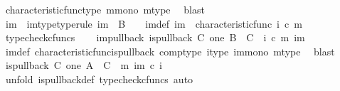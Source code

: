 \begin{isabellebody}
\ characteristic{\isacharunderscore}{\kern0pt}func{\isacharunderscore}{\kern0pt}type\ m{\isacharunderscore}{\kern0pt}mono\ m{\isacharunderscore}{\kern0pt}type\ \isamarkupfalse%
\ blast\isanewline
\ \ \isamarkupfalse%
\ {\isasymchi}im\ \ {\isasymchi}im{\isacharunderscore}{\kern0pt}type{\isacharbrackleft}{\kern0pt}type{\isacharunderscore}{\kern0pt}rule{\isacharbrackright}{\kern0pt}{\isacharcolon}{\kern0pt}\ {\isachardoublequoteopen}{\isasymchi}im\ {\isacharcolon}{\kern0pt}\ B\ {\isasymrightarrow}\ {\isasymOmega}{\isachardoublequoteclose}\ \ {\isasymchi}im{\isacharunderscore}{\kern0pt}def{\isacharcolon}{\kern0pt}\ {\isachardoublequoteopen}{\isasymchi}im\ {\isacharequal}{\kern0pt}\ characteristic{\isacharunderscore}{\kern0pt}func\ {\isacharparenleft}{\kern0pt}i\ {\isasymcirc}\isactrlsub c\ m{\isacharparenright}{\kern0pt}{\isachardoublequoteclose}\isanewline
\ \ \ \ \isamarkupfalse%
\ {\isacharparenleft}{\kern0pt}typecheck{\isacharunderscore}{\kern0pt}cfuncs{\isacharparenright}{\kern0pt}\isanewline
\ \ \isamarkupfalse%
\ {\isasymchi}im{\isacharunderscore}{\kern0pt}pullback{\isacharcolon}{\kern0pt}\ {\isachardoublequoteopen}is{\isacharunderscore}{\kern0pt}pullback\ C\ one\ B\ {\isasymOmega}\ {\isacharparenleft}{\kern0pt}{\isasymbeta}\isactrlbsub C\isactrlesub {\isacharparenright}{\kern0pt}\ {\isasymt}\ {\isacharparenleft}{\kern0pt}i\ {\isasymcirc}\isactrlsub c\ m{\isacharparenright}{\kern0pt}\ {\isasymchi}im{\isachardoublequoteclose}\isanewline
\ \ \ \ \isamarkupfalse%
\ {\isasymchi}im{\isacharunderscore}{\kern0pt}def\ characteristic{\isacharunderscore}{\kern0pt}func{\isacharunderscore}{\kern0pt}is{\isacharunderscore}{\kern0pt}pullback\ comp{\isacharunderscore}{\kern0pt}type\ i{\isacharunderscore}{\kern0pt}type\ im{\isacharunderscore}{\kern0pt}mono\ m{\isacharunderscore}{\kern0pt}type\ \isamarkupfalse%
\ blast\isanewline
\ \ \isamarkupfalse%
\ {\isachardoublequoteopen}is{\isacharunderscore}{\kern0pt}pullback\ C\ one\ A\ {\isasymOmega}\ {\isacharparenleft}{\kern0pt}{\isasymbeta}\isactrlbsub C\isactrlesub {\isacharparenright}{\kern0pt}\ {\isasymt}\ m\ {\isacharparenleft}{\kern0pt}{\isasymchi}im\ {\isasymcirc}\isactrlsub c\ i{\isacharparenright}{\kern0pt}{\isachardoublequoteclose}\isanewline
\ \ \isamarkupfalse%
\ {\isacharparenleft}{\kern0pt}unfold\ is{\isacharunderscore}{\kern0pt}pullback{\isacharunderscore}{\kern0pt}def{\isacharcomma}{\kern0pt}\ typecheck{\isacharunderscore}{\kern0pt}cfuncs{\isacharcomma}{\kern0pt}\ auto{\isacharparenright}{\kern0pt}\isanewline

\end{isabellebody}
